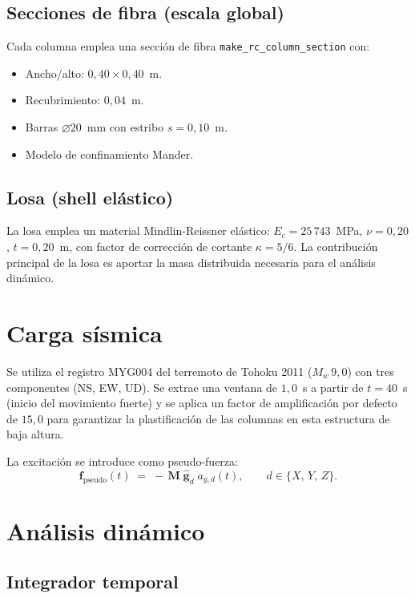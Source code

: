 \subsection{Secciones de fibra (escala global)}

Cada columna emplea una sección de fibra
\texttt{make\_rc\_column\_section} con:
\begin{itemize}
  \item Ancho/alto: $0{,}40 \times 0{,}40$~m.
  \item Recubrimiento: $0{,}04$~m.
  \item Barras $\varnothing 20$~mm con estribo $s = 0{,}10$~m.
  \item Modelo de confinamiento Mander.
\end{itemize}

\subsection{Losa (shell elástico)}

La losa emplea un material Mindlin-Reissner elástico:
$E_c = 25\,743$~MPa, $\nu = 0{,}20$, $t = 0{,}20$~m,
con factor de corrección de cortante $\kappa = 5/6$.
La contribución principal de la losa es aportar la masa distribuida
necesaria para el análisis dinámico.

\section{Carga sísmica}

Se utiliza el registro MYG004 del terremoto de Tohoku 2011
($M_w\,9{,}0$) con tres componentes (NS, EW, UD).
Se extrae una ventana de $1{,}0$~s a partir de $t = 40$~s
(inicio del movimiento fuerte) y se aplica un factor de amplificación
por defecto de $15{,}0$ para garantizar la plastificación de las
columnas en esta estructura de baja altura.

La excitación se introduce como pseudo-fuerza:
\[
  \mathbf{f}_{\mathrm{pseudo}}(t) \;=\; -\,\mathbf{M}\;\hat{\mathbf{g}}_d\;a_{g,d}(t),
  \qquad d \in \{X,\,Y,\,Z\}.
\]

\section{Análisis dinámico}

\subsection{Integrador temporal}

